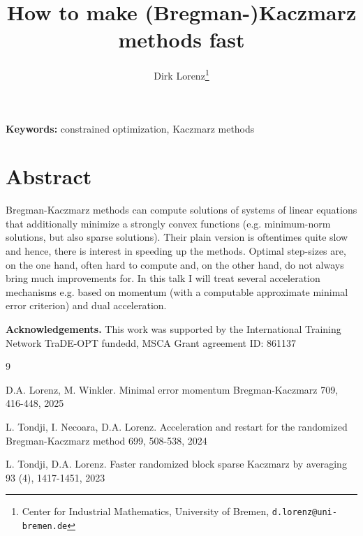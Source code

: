 \documentclass[11pt]{article}
\title{\bfseries How to make (Bregman-)Kaczmarz methods fast}
\author{
Dirk Lorenz\thanks{Center for Industrial Mathematics, University of Bremen,
\texttt{d.lorenz@uni-bremen.de}}
}
\date{}
\begin{document}
\maketitle

\vspace{-1em}

\noindent
\textbf{Keywords:}
constrained optimization, Kaczmarz methods

\vspace{0.5em}


\vspace{1em}

\section*{Abstract}

Bregman-Kaczmarz methods can compute solutions of systems of linear equations that additionally minimize a strongly convex functions (e.g. minimum-norm solutions, but also sparse solutions). Their plain version is oftentimes quite slow and hence, there is interest in speeding up the methods. Optimal step-sizes are, on the one hand, often hard to compute and, on the other hand, do not always bring much improvements for. In this talk I will treat several acceleration mechanisms e.g. based on momentum (with a computable approximate minimal error criterion) and dual acceleration.

\vspace{1em}

\noindent
\textbf{Acknowledgements.}
This work was supported by the International Training Network TraDE-OPT fundedd, MSCA Grant agreement ID: 861137

\vspace{1em}

\begin{thebibliography}{9}

D.A. Lorenz, M. Winkler.
\newblock  Minimal error momentum Bregman-Kaczmarz
 709, 416-448, 2025

L. Tondji, I. Necoara, D.A. Lorenz.
\newblock Acceleration and restart for the randomized Bregman-Kaczmarz method
 699, 508-538, 2024

L. Tondji, D.A. Lorenz.
\newblock Faster randomized block sparse Kaczmarz by averaging
 93 (4), 1417-1451, 2023

\end{thebibliography}
\end{document}
